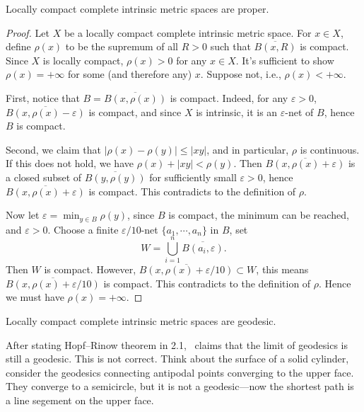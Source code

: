 \begin{thm}
    Locally compact complete intrinsic metric spaces are proper.
\end{thm}
\begin{proof}
    Let $X$ be a locally compact complete intrinsic metric space.
    For $x\in X$, define $\rho(x)$ to be the supremum of all $R>0$ such that $\overline{B(x,R)}$ is compact.
    Since $X$ is locally compact, $\rho(x)>0$ for any $x\in X$.
    It's sufficient to show $\rho(x)=+\infty$ for some (and therefore any) $x$.
    Suppose not, i.e., $\rho(x)<+\infty$.

    First, notice that $B=\overline{B(x,\rho(x))}$ is compact.
    Indeed, for any $\varepsilon>0$, $\overline{B(x,\rho(x)-\varepsilon)}$ is compact, and since $X$ is intrinsic, it is an $\varepsilon$-net of $B$, hence $B$ is compact.

    Second, we claim that $|\rho(x)-\rho(y)|\leq|xy|$, and in particular, $\rho$ is continuous.
    If this does not hold, we have $\rho(x)+|xy|<\rho(y)$.
    Then $\overline{B(x,\rho(x)+\varepsilon)}$ is a closed subset of $\overline{B(y,\rho(y))}$ for sufficiently small $\varepsilon>0$, hence $\overline{B(x,\rho(x)+\varepsilon)}$ is compact.
    This contradicts to the definition of $\rho$.

    Now let $\varepsilon=\min_{y\in B}\rho(y)$, since $B$ is compact, the minimum can be reached, and $\varepsilon>0$.
    Choose a finite $\varepsilon/10$-net $\{a_1,\cdots,a_n\}$ in $B$, set
    \[W=\bigcup_{i=1}^n\overline{B(a_i,\varepsilon)}.\]
    Then $W$ is compact.
    However, $\overline{B(x,\rho(x)+\varepsilon/10)}\subset W$, this means $\overline{B(x,\rho(x)+\varepsilon/10)}$ is compact.
    This contradicts to the definition of $\rho$.
    Hence we must have $\rho(x)=+\infty$.
\end{proof}

\begin{cor}
    Locally compact complete intrinsic metric spaces are geodesic.
\end{cor}

\begin{rem}
    After stating Hopf--Rinow theorem in 2.1, \cite{buragoADAlexandrovSpaces1992}~claims that the limit of geodesics is still a geodesic.
    This is not correct.
    Think about the surface of a solid cylinder, consider the geodesics connecting antipodal points converging to the upper face.
    They converge to a semicircle, but it is not a geodesic---now the shortest path is a line segement on the upper face.
\end{rem}

